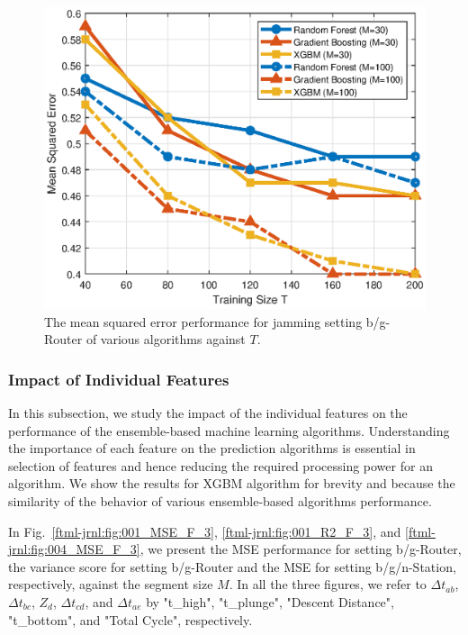 \begin{figure}[!ht]
	\centering
	\includegraphics[width=0.9\columnwidth]{./chapter-ftml/plots/001_MSE_T.eps}
	\caption{The mean squared error performance for jamming setting b/g-Router of various algorithms against $T$.}
	\label{ftml-jrnl:fig:001_MSE_T}      
\end{figure}


\subsubsection{Impact of Individual Features}
In this subsection, we study the impact of the individual features on the performance of the ensemble-based machine learning algorithms. Understanding the importance of each feature on the prediction algorithms is essential in selection of features and hence reducing the required processing power for an algorithm. We show the results for XGBM algorithm for brevity and because the similarity of the behavior of various ensemble-based algorithms performance. 

In Fig.~\ref{ftml-jrnl:fig:001_MSE_F_3}, \ref{ftml-jrnl:fig:001_R2_F_3}, and \ref{ftml-jrnl:fig:004_MSE_F_3}, we present the MSE performance for setting b/g-Router, the variance score for setting b/g-Router and the MSE for setting b/g/n-Station, respectively, against the segment size $M$. In all the three figures, we refer to $\Delta{t}_{ab}$, $\Delta{t}_{bc}$, $Z_d$, $\Delta{t}_{cd}$, and $\Delta{t}_{ae}$ by "t\_high", "t\_plunge", "Descent Distance", "t\_bottom", and "Total Cycle", respectively. 

